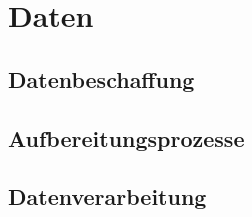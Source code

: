 \section{Daten}

\subsection{Datenbeschaffung}

\subsection{Aufbereitungsprozesse}

\subsection{Datenverarbeitung}